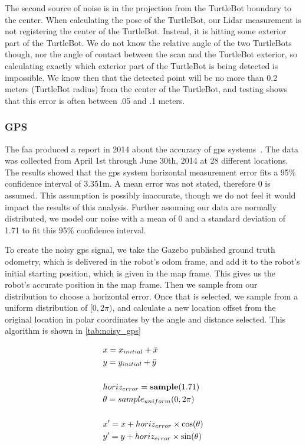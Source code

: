 \documentclass[thesis.tex]{subfile}
\begin{document}
The second source of noise is in the projection from the TurtleBot boundary to the center. When calculating the pose of the TurtleBot, our Lidar measurement is not registering the center of the TurtleBot. Instead, it is hitting some exterior part of the TurtleBot. We do not know the relative angle of the two TurtleBots though, nor the angle of contact between the scan and the TurtleBot exterior, so calculating exactly which exterior part of the TurtleBot is being detected is impossible. We know then that the detected point will be no more than 0.2 meters (TurtleBot radius) from the center of the TurtleBot, and testing shows that this error is often between .05 and .1 meters.

\subsubsection{GPS}
The \gls{faa} produced a report in 2014 about the accuracy of \gls{gps} systems~\cite{FAAGPS}. The data was collected from April 1st through June 30th, 2014 at 28 different locations. The results showed that the \gls{gps} system horizontal measurement error fits a 95\% confidence interval of 3.351m. A mean error was not stated, therefore 0 is assumed. This assumption is possibly inaccurate, though we do not feel it would impact the results of this analysis. Further assuming our data are normally distributed, we model our noise with a mean of 0 and a standard deviation of 1.71 to fit this 95\% confidence interval.

To create the noisy \gls{gps} signal, we take the Gazebo published ground truth odometry, which is delivered in the robot's odom frame, and add it to the robot's initial starting position, which is given in the map frame. This gives us the robot's accurate position in the map frame. Then we sample from our distribution to choose a horizontal error. Once that is selected, we sample from a uniform distribution of $[0, 2\pi)$, and calculate a new location offset from the original location in polar coordinates by the angle and distance selected. This algorithm is shown in \cref{tab:noisy_gps}

\begin{table}[htbp]
\centering
\begin{align}
&x = x_{initial} + \bar{x}\\
&y = y_{initial} + \bar{y}\\
\notag \\
&horiz_{error} = \textbf{sample}(1.71)\\
&\theta = \textbf{$sample_{uniform}$}(0, 2\pi)\\
\notag \\
&x' = x + horiz_{error} \times \cos(\theta)\\
&y' = y + horiz_{error} \times \sin(\theta)
\end{align}
\caption{Algorithm for generating noisy\_gps positions. These are received by the robot at a rate of \SI{0.1}{\hertz}}
\label{tab:noisy_gps}
\end{table}
\end{document}
